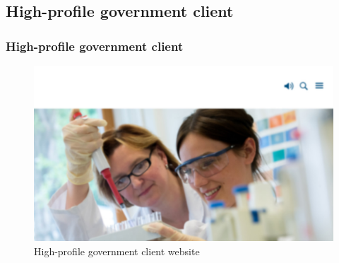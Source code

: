 \documentclass[aspectratio=169]{beamer}
\begin{document}
\subsection{High-profile government client}
\begin{frame}
  \frametitle{High-profile government client}
  \begin{figure}
    \includegraphics[height=.7\textheight]{./src/img/004_-_government_client.jpg}
    \caption{High-profile government client website}
  \end{figure}
\end{frame}
\end{document}
